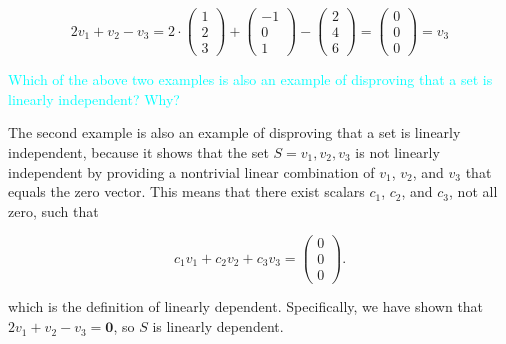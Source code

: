 \documentclass[fontsize=12pt]{scrartcl}
\begin{document}
$$2v_1 + v_2 - v_3 = 2\cdot \left(\begin{array}{c} 1 \\ 2 \\ 3 \end{array} \right) + \left(\begin{array}{c} -1 \\ 0 \\1 \end{array} \right) - \left(\begin{array}{c} 2 \\ 4 \\6 \end{array} \right) = \left(\begin{array}{c} 0 \\ 0 \\0 \end{array} \right) = v_3$$

\noindent
\textcolor{cyan}{Which of the above two examples is also an example of disproving that a set is linearly independent? Why?}

\noindent
The second example is also an example of disproving that a set is linearly independent, because it shows that the set $S = {v_1, v_2, v_3}$ is not linearly independent by providing a nontrivial linear combination of $v_1$, $v_2$, and $v_3$ that equals the zero vector. This means that there exist scalars $c_1$, $c_2$, and $c_3$, not all zero, such that

$$c_1v_1+c_2v_2+c_3v_3 = \left(\begin{array}{c} 0 \\ 0 \\ 0
\end{array} \right).$$

which is the definition of linearly dependent. Specifically, we have shown that $2v_1 + v_2 - v_3 = \mathbf{0}$, so $S$ is linearly dependent.
\end{document}
